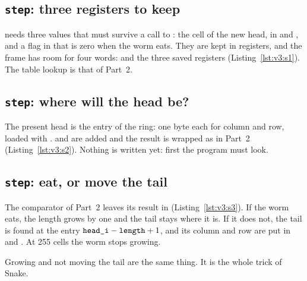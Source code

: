 
\subsection{\texttt{step}: three registers to keep}


 needs three values that must survive a call to
: the cell of the new head, in  and , and a
flag in  that is zero when the worm eats. They are kept in 
registers, and the frame has room for four words:  and the three
saved registers (Listing~\ref{lst:v3:s1}). The table lookup is that of
Part~2.

\subsection{\texttt{step}: where will the head be?}


The present head is the entry  of the ring: one byte each for
column and row, loaded with .  and  are added and
the result is wrapped as in Part~2 (Listing~\ref{lst:v3:s2}). Nothing is
written yet: first the program must look.

\subsection{\texttt{step}: eat, or move the tail}


The comparator of Part~2 leaves its result in 
(Listing~\ref{lst:v3:s3}). If the worm eats, the length grows by one and the
tail stays where it is. If it does not, the tail is found at the entry
$\texttt{head\_i}-\texttt{length}+1$, and its column and row are put in 
and . At 255 cells the worm stops growing.

\begin{prgconcept}
Growing and not moving the tail are the same thing. It is the whole trick of
Snake.
\end{prgconcept}

